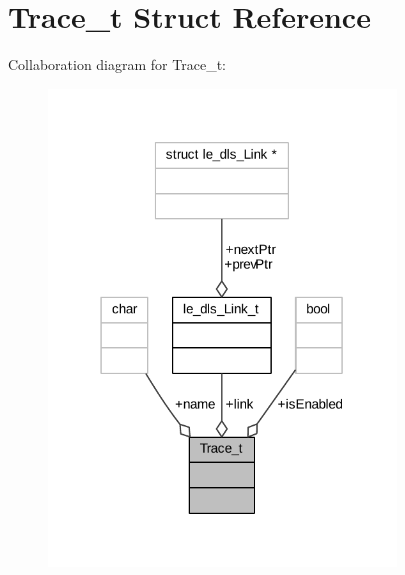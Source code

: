 \hypertarget{struct_trace__t}{}\section{Trace\+\_\+t Struct Reference}
\label{struct_trace__t}


Collaboration diagram for Trace\+\_\+t\+:
\nopagebreak
\begin{figure}[H]
\begin{center}
\leavevmode
\includegraphics[width=262pt]{struct_trace__t__coll__graph}
\end{center}
\end{figure}
